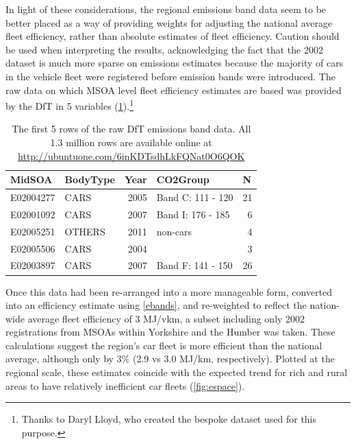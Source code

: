 In light of these considerations, the regional emissions band data seem to be
better placed as a way of providing weights for adjusting the
national average fleet efficiency, rather than absolute estimates of
fleet efficiency. Caution should be used when interpreting the results,
acknowledging the fact that the 2002 dataset is much more sparse on
emissions estimates because the majority of cars in the vehicle fleet
were registered before emission bands were introduced.
The raw
data on which MSOA level fleet efficiency estimates are based was provided by
the DfT in 5 variables (\cref{tefraw}).\footnote{Thanks to Daryl Lloyd,
who created the bespoke dataset
used for this purpose.
}

\begin{table}[htbp]
\caption[The first 5 rows of the raw DfT emissions band data]
{The first 5 rows of the raw DfT emissions band data. All 1.3 million
rows are available online at \href{http://ubuntuone.com/6inKDTsdhLkFQNat0O6QOK}
{http://ubuntuone.com/6inKDTsdhLkFQNat0O6QOK}}
\begin{center}
\begin{tabular}{llrlr}
\toprule
MidSOA & BodyType & \multicolumn{1}{l}{Year} & CO2Group & \multicolumn{1}{l}{N} \\
\midrule
E02004277 & CARS & 2005 & Band C: 111 - 120 & 21 \\
E02001092 & CARS & 2007 & Band I: 176 - 185 & 6 \\
E02005251 & OTHERS & 2011 & non-cars & 4 \\
E02005506 & CARS & 2004 &  & 3 \\
E02003897 & CARS & 2007 & Band F: 141 - 150 & 26 \\
\bottomrule
\end{tabular} \end{center}
\label{tefraw}
\end{table}

Once this data had been re-arranged into a more manageable form, converted into
an efficiency estimate using \cref{ebands}, and re-weighted to reflect the nation-wide
average fleet efficiency of 3 MJ/vkm,
a subset including only 2002 registrations from MSOAs within
Yorkshire and the Humber was taken. These calculations suggest the region's car fleet is more
efficient than the national average, although only by 3\% (2.9 vs 3.0 MJ/km, respectively).
Plotted at the regional scale, these estimates coincide with the expected trend for rich
and rural areas to have relatively inefficient car fleets (\cref{fig:espace}).

